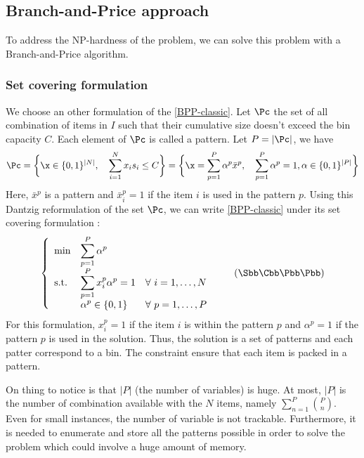 \subsection{Branch-and-Price approach }

To address the NP-hardness of the problem, we can solve this problem with a Branch-and-Price algorithm.

\subsubsection{Set covering formulation}

We choose an other formulation of the \eqref{BPP-classic}. Let $\Pc$ the set of all combination of items in $I$ such that their cumulative size doesn't exceed the bin capacity $C$. Each element of $\Pc$ is called a pattern. Let $P=|\Pc|$, we have
\begin{equation*}
	\Pc = \bigg \{ \x \in \{0,1\}^{|N|}, \quad \sum_{i=1}^N x_i s_i \leq C \bigg \} = \bigg \{ \x = \sum_{p=1}^P \alpha^p \bar{x}^p, \quad \sum_{p=1}^P \alpha^p = 1, \alpha \in \{0,1\}^{|P|}  \bigg \}
\end{equation*}
Here, $\bar{x}^p$ is a pattern and $\bar{x}^p_i=1$ if the item $i$ is used in the pattern $p$. Using this Dantzig reformulation of the set $\Pc$, we can write \eqref{BPP-classic} under its set covering formulation :
\begin{equation}
	\label{SCBPP}
		\left \{
		\begin{array}{*5{>{\displaystyle}l}}
		\min & \sum_{p=1}^P \alpha^p \\
		\st & \sum_{p=1}^P x_i^p\alpha^p = 1 & \forall \ i = 1,\dots,N \\
		& \alpha^{p} \in \{0,1\} &  \forall \ p = 1,\dots,P
		\end{array}
		\right.
	\tag{$\Sbb\Cbb\Bbb\Pbb\Pbb$}
\end{equation}
For this formulation, $x_i^p=1$ if the item $i$ is within the pattern $p$ and $\alpha^p=1$ if the pattern $p$ is used in the solution. Thus, the solution is a set of patterns and each patter correspond to a bin. The constraint ensure that each item is packed in a pattern.

On thing to notice is that $|P|$ (the number of variables) is huge. At most, $|P|$ is the number of combination available with the $N$ items, namely $\sum_{n=1}^P \binom{P}{n}$. Even for small instances, the number of variable is not trackable. Furthermore, it is needed to enumerate and store all the patterns possible in order to solve the problem which could involve a huge amount of memory. 

